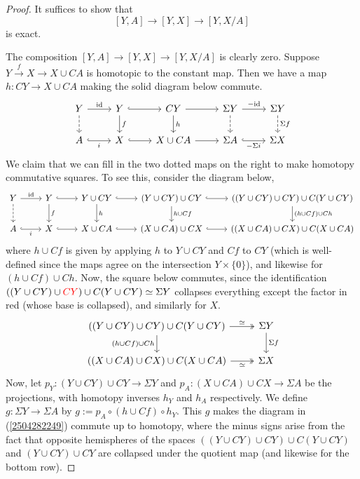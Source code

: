 \documentclass[11pt, titlepage]{article} %
\def\id{\ensuremath\text{id}}
\def\textcolour{\textcolor}
\numberwithin{equation}{subsection}
\theoremstyle{plain}
\theoremstyle{definition}
\begin{document}
\begin{proof}
It suffices to show that 
\[[Y,A]\to [Y,X]\to [Y, X/A]\]
is exact. 

The composition \([Y,A]\to [Y,X]\to [Y,X/A]\) is clearly zero. Suppose \(Y \xrightarrow{f} X \to X\cup CA\) is homotopic to the constant map. Then we have a map \(h : CY \to X\cup CA\) making the solid diagram below commute.
\begin{equation}\label{2504282249}
\begin{tikzcd} 
Y \arrow[r, "\id"] \arrow[d, swap, "", dashrightarrow]  & Y \arrow[r, "", hookrightarrow] \arrow[d, "f"] & CY \arrow[d, "h"] \arrow[r, ""] & \Sigma Y \arrow[d, "", dashrightarrow] \arrow[r, "-\id"] & \Sigma Y \arrow[d, "\Sigma f", dashrightarrow]\\ 
 A \arrow[r, swap, "i", hookrightarrow]  & X \arrow[r, ""', hookrightarrow] & X\cup CA \arrow[r, ""'] & \Sigma A \arrow[r, "-\Sigma i"', hookrightarrow] & \Sigma X 
\end{tikzcd}
\end{equation}
We claim that we can fill in the two dotted maps on the right to make homotopy commutative squares. To see this, consider the diagram below,
\[\begin{tikzcd} 
Y \arrow[r, "\id"] \arrow[d, swap, "", dashrightarrow]  & Y \arrow[r, "", hookrightarrow] \arrow[d, "f"] & Y\cup CY \arrow[d, "h"] \arrow[r, "", hookrightarrow] & (Y\cup CY)\cup CY \arrow[d, "h\cup Cf"] \arrow[r, "", hookrightarrow] & ((Y\cup CY)\cup CY)\cup C(Y\cup CY) \arrow[d, "(h\cup Cf)\cup Ch"]\\ 
 A \arrow[r, swap, "i", hookrightarrow]  & X \arrow[r, ""', hookrightarrow] & X\cup CA \arrow[r, ""', hookrightarrow] & (X\cup CA)\cup CX \arrow[r, ""', hookrightarrow] & ((X\cup CA)\cup CX) \cup C(X\cup CA)
 \end{tikzcd}\] 
where \(h\cup Cf\) is given by applying \(h\) to \(Y\cup CY\) and \(Cf\) to \(CY\) (which is well-defined since the maps agree on the intersection \(Y\times \{0\}\)), and likewise for \((h\cup Cf)\cup Ch\). Now, the square below commutes, since the identification \(((Y\cup CY)\cup \textcolour{red}{CY})\cup C(Y\cup CY)\simeq \Sigma Y\) collapses everything except the factor in red (whose base is collapsed), and similarly for \(X\). 
\[\begin{tikzcd}
((Y\cup CY)\cup CY)\cup C(Y\cup CY) \arrow[r, "\simeq", twoheadrightarrow] \arrow[d, swap, "(h\cup Cf)\cup Ch"]  & \Sigma Y \arrow[d, "\Sigma f"]  \\
((X\cup CA)\cup CX)\cup C(X\cup CA) \arrow[r, swap, "\simeq", twoheadrightarrow]  & \Sigma X
\end{tikzcd}\]
Now, let \(p_Y : (Y\cup CY)\cup CY \to \Sigma Y\) and \(p_A : (X\cup CA)\cup CX\to \Sigma A\) be the projections, with homotopy inverses \(h_Y\) and \(h_A\) respectively. We define \(g : \Sigma Y \to \Sigma A\) by \(g := p_A \circ (h\cup Cf)\circ h_Y\). This \(g\) makes the diagram in (\ref{2504282249}) commute up to homotopy, where the minus signs arise from the fact that opposite hemispheres of the spaces \(((Y\cup CY)\cup CY)\cup C(Y\cup CY)\) and \((Y\cup CY)\cup CY\) are collapsed under the quotient map (and likewise for the bottom row). 


\end{proof}
\end{document}
